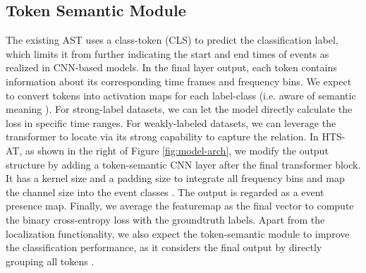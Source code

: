 \documentclass{article}
\begin{document}
\subsection{Token Semantic Module}
The existing AST uses a class-token (CLS) to predict the classification label, which limits it from further indicating the start and end times of events as realized in CNN-based models. In the final layer output, each token contains information about its corresponding time frames and frequency bins. We expect to convert tokens into activation maps for each label-class (i.e. aware of semantic meaning \cite{tscam}). For strong-label datasets, we can let the model directly calculate the loss in specific time ranges. For weakly-labeled datasets, we can leverage the transformer to locate via its strong capability to capture the relation. In HTS-AT, as shown in the right of Figure \ref{fig:model-arch}, we modify the output structure by adding a token-semantic CNN layer after the final transformer block. It has a kernel size  and a padding size  to integrate all frequency bins and map the channel size  into the event classes . The output  is regarded as a event presence map. Finally, we average the featuremap as the final vector  to compute the binary cross-entropy loss with the groundtruth labels. Apart from the localization functionality, we also expect the token-semantic module to improve the classification performance, as it considers the final output by directly grouping all tokens .


\vspace{-0.2cm}
\end{document}
